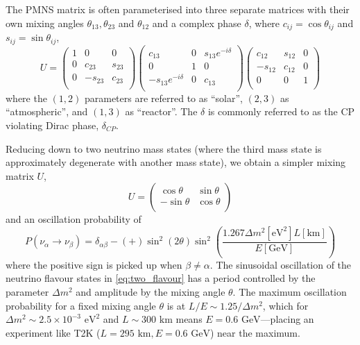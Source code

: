 The PMNS matrix is often parameterised into three separate matrices with their own mixing angles $\theta_{13},\theta_{23}$ and $\theta_{12}$ and a complex phase $\delta$, where $c_{ij}=\cos\theta_{ij}$ and $s_{ij}=\sin\theta_{ij}$\cite{boris_mixing},
\begin{equation}
U = 
\begin{pmatrix}
1 & 0 & 0 \\
0 & c_{23} & s_{23} \\
0 & -s_{23} & c_{23} \\
\end{pmatrix}
\begin{pmatrix}
c_{13} & 0 & s_{13}e^{-i\delta} \\
0 & 1 & 0 \\
-s_{13}e^{-i\delta} & 0 & c_{13} \\
\end{pmatrix}
\begin{pmatrix}
c_{12} & s_{12} & 0 \\
-s_{12} & c_{12} & 0 \\
0 & 0 & 1 \\
\end{pmatrix}
\end{equation}
where the $(1,2)$ parameters are referred to as ``solar'', $(2,3)$ as ``atmospheric'', and $(1,3)$ as ``reactor''. The $\delta$ is commonly referred to as the CP violating Dirac phase, $\delta_{CP}$. 

Reducing down to two neutrino mass states (where the third mass state is approximately degenerate with another mass state), we obtain a simpler mixing matrix $U$,
\begin{equation}
U = 
\begin{pmatrix}
\cos\theta & \sin\theta \\
- \sin\theta & \cos \theta \\
\end{pmatrix}
\end{equation}
and an oscillation probability of
\begin{equation}
P(\nu_\alpha \rightarrow \nu_\beta) = \delta_{\alpha \beta} -(+) \sin^2 \left( 2\theta \right) \sin^2 \left( \frac{1.267 \Delta m^2 \left[\text{eV}^2\right] L\left[\text{km}\right]}{E\left[\text{GeV}\right]} \right)
\label{eq:two_flavour}
\end{equation}
where the positive sign is picked up when $\beta \neq \alpha$. The sinusoidal oscillation of the neutrino flavour states in \autoref{eq:two_flavour} has a period controlled by the parameter $\Delta m^2$ and amplitude by the mixing angle $\theta$. The maximum oscillation probability for a fixed mixing angle $\theta$ is at $L/E \sim 1.25/\Delta m^2$, which for $\Delta m^2 \sim 2.5\times10^{-3}\text{ eV}^2$ and $L\sim300\text{ km}$ means $E=0.6\text{ GeV}$---placing an experiment like T2K ($L=295\text{ km}, E = 0.6\text{ GeV}$) near the maximum.

